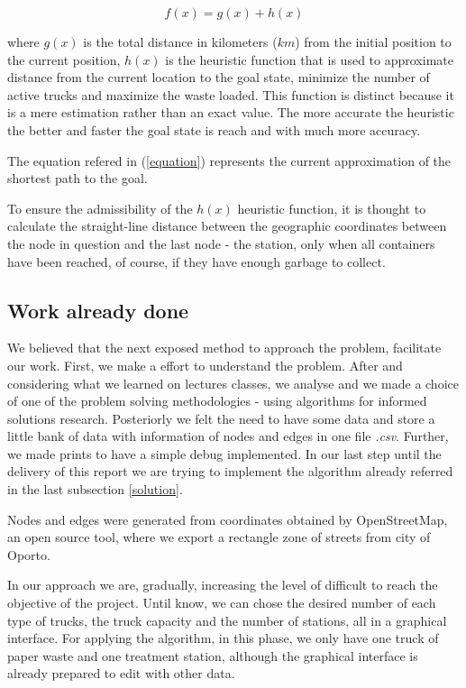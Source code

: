 \documentclass[a4paper]{article}
\begin{document}
\begin{equation}\label{equation}
f(x) = g(x) + h(x)
\end{equation}

where $g(x)$ is the total distance in kilometers ($km$) from the initial position to the current position, $h(x)$ is the heuristic function that is used to approximate distance from the current location to the goal state, minimize the number of active trucks and maximize the waste loaded. This function is distinct because it is a mere estimation rather than an exact value. The more accurate the heuristic the better and faster the goal state is reach and with much more accuracy.

The equation refered in (\ref{equation}) represents the current approximation of the shortest path to the goal. 

To ensure the admissibility of the $h(x)$ heuristic function, it is thought to calculate the straight-line distance between the geographic coordinates between the node in question and the last node - the station, only when all containers have been reached, of course, if they have enough garbage to collect.

\subsection{Work already done}

We believed that the next exposed method to approach the problem, facilitate our work. First, we make a effort to understand the problem. After and considering what we learned on lectures classes, we analyse and we made a choice of one of the problem solving methodologies - using algorithms for informed solutions research. 
Posteriorly we felt the need to have some data and store a little bank of data with information of nodes and edges in one file \emph{.csv}.
Further, we made prints to have a simple debug implemented. 
In our last step until the delivery of this report we are trying to implement the algorithm already referred in the last subsection \ref{solution}.

Nodes and edges were generated from coordinates obtained by OpenStreetMap, an open source tool, where we export a rectangle zone of streets from city of Oporto. 

In our approach we are, gradually, increasing the level of difficult to reach the objective of the project. Until know, we can chose the desired number of each type of trucks, the truck capacity and the number of stations, all in a graphical interface. For applying the algorithm, in this phase, we only have one truck of paper waste and one treatment station, although the graphical interface is already prepared to edit with other data. 
\end{document}
